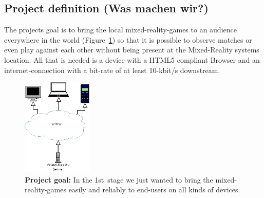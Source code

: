 \documentclass[journal]{IEEEtran}
\begin{document}
\subsection{Project definition (Was machen wir?)}
The projects goal is to bring the local mixed-reality-games to an audience
everywhere in the world (Figure~\ref{fig:proj_goal}) so that it is possible to
observe matches or even play against each other without being present at the
Mixed-Reality systems location. All that is needed is a device with a HTML5
compliant Browser and an internet-connection with a bit-rate of at least 10-kbit/s downstream.
\begin{figure}[!t]
    \centering
    \includegraphics[width=0.3\textwidth]{project-target.png}
    \caption{\textbf{Project goal:} In the 1st~stage we just wanted to bring the mixed-reality-games easily and reliably to end-users on all kinds of devices.}
    \label{fig:proj_goal}
\end{figure}
\end{document}
